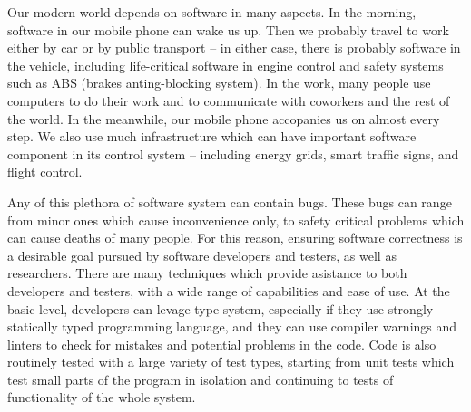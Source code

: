 Our modern world depends on software in many aspects.
In the morning, software in our mobile phone can wake us up.
Then we probably travel to work either by car or by public transport -- in either case, there is probably software in the vehicle, including life-critical software in engine control and safety systems such as ABS (brakes anting-blocking system).
In the work, many people use computers to do their work and to communicate with coworkers and the rest of the world.
In the meanwhile, our mobile phone accopanies us on almost every step.
We also use much infrastructure which can have important software component in its control system -- including energy grids, smart traffic signs, and flight control.

Any of this plethora of software system can contain bugs.
These bugs can range from minor ones which cause inconvenience only, to safety critical problems which can cause deaths of many people.
For this reason, ensuring software correctness is a desirable goal pursued by software developers and testers, as well as researchers.
There are many techniques which provide asistance to both developers and testers, with a wide range of capabilities and ease of use.
At the basic level, developers can levage type system, especially if they use strongly statically typed programming language, and they can use compiler warnings and linters to check for mistakes and potential problems in the code.
Code is also routinely tested with a large variety of test types, starting from unit tests which test small parts of the program in isolation and continuing to tests of functionality of the whole system.

